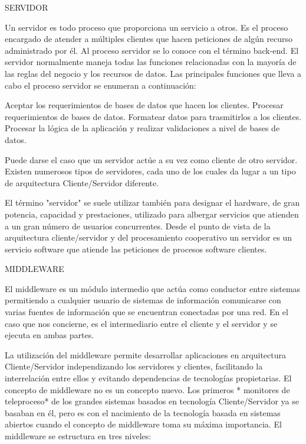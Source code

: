 SERVIDOR

Un servidor es todo proceso que proporciona un servicio a otros. Es el proceso encargado de atender a múltiples clientes que hacen peticiones 
de algún recurso administrado por él. Al proceso servidor se lo conoce con el término back-end. El servidor normalmente maneja todas las 
funciones relacionadas con la mayoría de las reglas del negocio y los recursos de datos. Las principales funciones que lleva a cabo el 
proceso servidor se enumeran a continuación:

    Aceptar los requerimientos de bases de datos que hacen los clientes.
    Procesar requerimientos de bases de datos.
    Formatear datos para trasmitirlos a los clientes.
    Procesar la lógica de la aplicación y realizar validaciones a nivel de bases de datos.

Puede darse el caso que un servidor actúe a su vez como cliente de otro servidor. Existen numerosos tipos de servidores, cada uno de los 
cuales da lugar a un tipo de arquitectura Cliente/Servidor diferente.

    El término "servidor" se suele utilizar también para designar el hardware, de gran potencia, capacidad y prestaciones, utilizado para 
    albergar servicios que atienden a un gran número de usuarios concurrentes. Desde el punto de vista de la arquitectura cliente/servidor 
    y del procesamiento cooperativo un servidor es un servicio software que atiende las peticiones de procesos software clientes.
    
    
MIDDLEWARE

El middleware es un módulo intermedio que actúa como conductor entre sistemas permitiendo a cualquier usuario de sistemas de información 
comunicarse con varias fuentes de información que se encuentran conectadas por una red. En el caso que nos concierne, es el intermediario 
entre el cliente y el servidor y se ejecuta en ambas partes.

La utilización del middleware permite desarrollar aplicaciones en arquitectura Cliente/Servidor independizando los servidores y clientes, 
facilitando la interrelación entre ellos y evitando dependencias de tecnologías propietarias. El concepto de middleware no es un concepto 
nuevo. Los primeros * monitores de teleproceso* de los grandes sistemas basados en tecnología Cliente/Servidor ya se basaban en él, pero 
es con el nacimiento de la tecnología basada en sistemas abiertos cuando el concepto de middleware toma su máxima importancia. El middleware 
se estructura en tres niveles:

